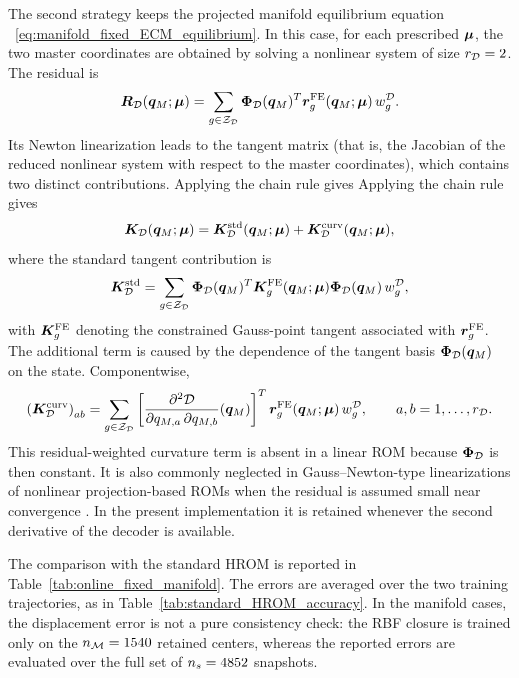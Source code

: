 \documentclass[11pt,a4paper]{article}
\begin{document}
The second strategy keeps the projected manifold equilibrium equation
 ~\eqref{eq:manifold_fixed_ECM_equilibrium}. In this case, for each prescribed
$\bm{\mu}$, the two master coordinates are obtained by solving a nonlinear
system of size $r_{\mathcal{D}}=2$. The residual is
\[
    \bm{R}_{\mathcal{D}}(\bm{q}_M;\bm{\mu})
    =
    \sum_{g\in\mathcal{Z}_{\mathcal{D}}}
    \bm{\Phi}_{\mathcal{D}}(\bm{q}_M)^T
    \bm{r}^{\mathrm{FE}}_{g}(\bm{q}_M;\bm{\mu})
    \,w^{\mathcal{D}}_{g}.
\]
Its Newton linearization leads to the tangent matrix (that is, the Jacobian of
the reduced nonlinear system with respect to the master coordinates), which
contains two distinct contributions. Applying the chain rule gives Applying the chain rule
gives
\begin{equation}
\label{eq:manifold_tangent_split}
    \bm{K}_{\mathcal{D}}(\bm{q}_M;\bm{\mu})
    =
    \bm{K}_{\mathcal{D}}^{\mathrm{std}}(\bm{q}_M;\bm{\mu})
    +
    \bm{K}_{\mathcal{D}}^{\mathrm{curv}}(\bm{q}_M;\bm{\mu}),
\end{equation}
where the standard tangent contribution is
\begin{equation}
\label{eq:manifold_standard_tangent}
    \bm{K}_{\mathcal{D}}^{\mathrm{std}}
    =
    \sum_{g\in\mathcal{Z}_{\mathcal{D}}}
    \bm{\Phi}_{\mathcal{D}}(\bm{q}_M)^T
    \bm{K}^{\mathrm{FE}}_g(\bm{q}_M;\bm{\mu})
    \bm{\Phi}_{\mathcal{D}}(\bm{q}_M)
    \,w^{\mathcal{D}}_{g},
\end{equation}
with $\bm{K}^{\mathrm{FE}}_g$ denoting the constrained Gauss-point tangent associated with
$\bm{r}^{\mathrm{FE}}_{g}$. The additional term is caused by the dependence of the tangent basis
$\bm{\Phi}_{\mathcal{D}}(\bm{q}_M)$ on the state. Componentwise,
\begin{equation}
\label{eq:manifold_curvature_tangent}
    \left(\bm{K}_{\mathcal{D}}^{\mathrm{curv}}\right)_{ab}
    =
    \sum_{g\in\mathcal{Z}_{\mathcal{D}}}
    \left[
    \dfrac{\partial ^2\mathcal{\boldsymbol{D}}}{\partial q_{M,a}\,\partial q_{M,b}}(\bm{q}_M)
    \right]^T
    \bm{r}^{\mathrm{FE}}_{g}(\bm{q}_M;\bm{\mu})
    \,w^{\mathcal{D}}_{g},
    \qquad
    a,b=1,\ldots,r_{\mathcal{D}} .
\end{equation}
This residual-weighted curvature term is absent in a linear ROM because
$\bm{\Phi}_{\mathcal{D}}$ is then constant. It is also commonly neglected in Gauss--Newton-type
linearizations of nonlinear projection-based ROMs when the residual is assumed
small near convergence \cite{barnett2022quadratic,ares2026nonlinear}. In the
present implementation it is retained whenever the second derivative of the
decoder is available.

The comparison with the standard HROM is reported in
Table~\ref{tab:online_fixed_manifold}. The errors are averaged over the two
training trajectories, as in Table~\ref{tab:standard_HROM_accuracy}. In the
manifold cases, the displacement error is not a pure consistency check: the RBF
closure is trained only on the $n_{\mathcal{M}}=1540$ retained centers, whereas the
reported errors are evaluated over the full set of $n_s = 4852$ snapshots.
\end{document}
